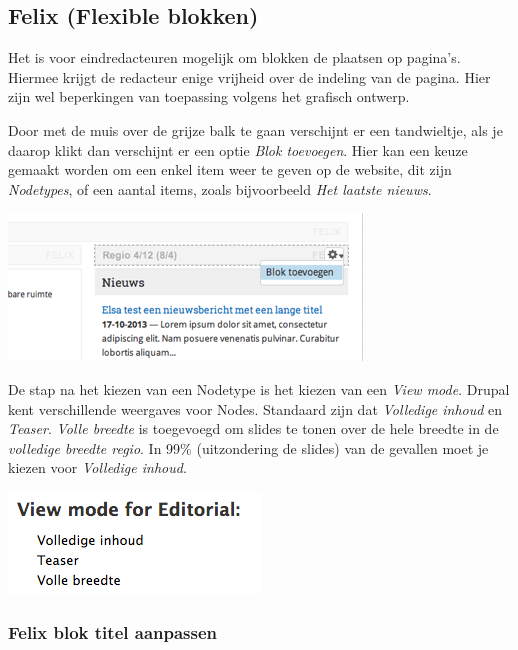 
\subsection{Felix (Flexible blokken)}\label{felix}
Het is voor eindredacteuren mogelijk om blokken de plaatsen op pagina's. Hiermee krijgt de redacteur enige vrijheid over de indeling van de pagina. Hier zijn wel beperkingen van toepassing volgens het grafisch ontwerp.

Door met de muis over de grijze balk te gaan verschijnt er een tandwieltje, als je daarop klikt dan verschijnt er een optie \emph{Blok toevoegen}. Hier kan een keuze gemaakt worden om een enkel item weer te geven op de website, dit zijn \emph{Nodetypes}, of een aantal items, zoals bijvoorbeeld \emph{Het laatste nieuws}.

\begin{center}
	\includegraphics[width=\textwidth]{img/felix.png}
\end{center}

De stap na het kiezen van een Nodetype is het kiezen van een \emph{View mode}. Drupal kent verschillende weergaves voor Nodes. Standaard zijn dat \emph{Volledige inhoud} en \emph{Teaser}. \emph{Volle breedte} is toegevoegd om slides te tonen over de hele breedte in de \emph{volledige breedte regio}. In 99\% (uitzondering de slides) van de gevallen moet je kiezen voor \emph{Volledige inhoud}.

\begin{center}
	\includegraphics[scale=1.0]{img/felixviewmode.png}
\end{center}

\subsubsection{Felix blok titel aanpassen}\label{felixbloktitel}

